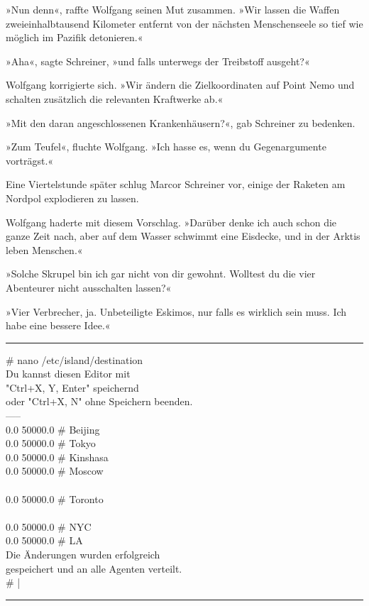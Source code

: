 »Nun denn«, raffte Wolfgang seinen Mut zusammen. »Wir lassen die Waffen zweieinhalbtausend Kilometer entfernt von der nächsten Menschenseele so tief wie möglich im Pazifik detonieren.«

»Aha«, sagte Schreiner, »und falls unterwegs der Treibstoff ausgeht?«

Wolfgang korrigierte sich. »Wir ändern die Zielkoordinaten auf Point Nemo und schalten zusätzlich die relevanten Kraftwerke ab.«

»Mit den daran angeschlossenen Krankenhäusern?«, gab Schreiner zu bedenken.

»Zum Teufel«, fluchte Wolfgang. »Ich hasse es, wenn du Gegenargumente vorträgst.«

Eine Viertelstunde später schlug Marcor Schreiner vor, einige der Raketen am Nordpol explodieren zu lassen.

Wolfgang haderte mit diesem Vorschlag. »Darüber denke ich auch schon die ganze Zeit nach, aber auf dem Wasser schwimmt eine Eisdecke, und in der Arktis leben Menschen.«

»Solche Skrupel bin ich gar nicht von dir gewohnt. Wolltest du die vier Abenteurer nicht ausschalten lassen?«

»Vier Verbrecher, ja. Unbeteiligte Eskimos, nur falls es wirklich sein muss. Ich habe eine bessere Idee.«

\noindent \parbox{\textwidth}{ \vspace{3ex} \hrule \vspace{3ex}

    \begin{footnotesize}
    \begin{ttfamily}

\noindent \# nano /etc/island/destination\\
\noindent Du kannst diesen Editor mit\\
\noindent "Ctrl+X, Y, Enter" speichernd\\
\noindent oder "Ctrl+X, N" ohne Speichern beenden.\\
\noindent -----\\
 0.0 50000.0 \# Beijing\\
 0.0 50000.0 \# Tokyo\\
 0.0 50000.0 \# Kinshasa\\
 0.0 50000.0 \# Moscow\\
\noindent […]\\
 0.0 50000.0 \# Toronto\\
\noindent […]\\
 0.0 50000.0 \# NYC\\
 0.0 50000.0 \# LA\\
\noindent Die Änderungen wurden erfolgreich\\
\noindent gespeichert und an alle Agenten verteilt.\\
\noindent \# |

    \end{ttfamily}
    \end{footnotesize}

\vspace{3ex} \hrule \vspace{3ex} }


